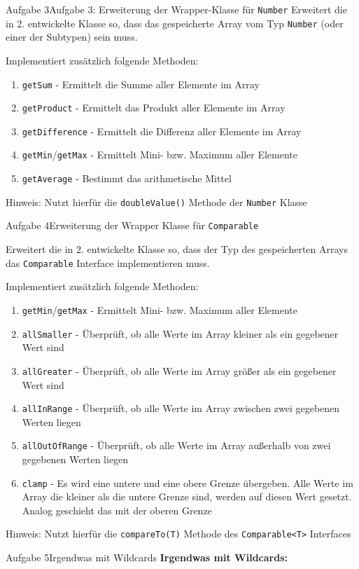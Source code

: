 \begin{frame}{Aufgabe 3}{Aufgabe 3: Erweiterung der Wrapper-Klasse für \texttt{Number}}    
    Erweitert die in 2. entwickelte Klasse so, dass das gespeicherte Array vom Typ \texttt{Number} (oder einer der Subtypen) sein muss.
    
    Implementiert zusätzlich folgende Methoden:
    \begin{enumerate}
        \item \texttt{getSum} - Ermittelt die Summe aller Elemente im Array
        \item \texttt{getProduct} - Ermittelt das Produkt aller Elemente im Array
        \item \texttt{getDifference} - Ermittelt die Differenz aller Elemente im Array
        \item \texttt{getMin}/\texttt{getMax} - Ermittelt Mini- bzw. Maximum aller Elemente
        \item \texttt{getAverage} - Bestimmt das arithmetische Mittel
    \end{enumerate}
    
    Hinweis: Nutzt hierfür die \texttt{doubleValue()} Methode der \texttt{Number} Klasse
\end{frame}
    
\begin{frame}[allowframebreaks]{Aufgabe 4}{Erweiterung der Wrapper Klasse für \texttt{Comparable}}
    
    Erweitert die in 2. entwickelte Klasse so, dass der Typ des gespeicherten Arrays das \texttt{Comparable} Interface implementieren muss.
    
    Implementiert zusätzlich folgende Methoden:
    \begin{enumerate}
        \item \texttt{getMin}/\texttt{getMax} - Ermittelt Mini- bzw. Maximum aller Elemente
        \item \texttt{allSmaller} - Überprüft, ob alle Werte im Array kleiner als ein gegebener Wert sind
        \item \texttt{allGreater} - Überprüft, ob alle Werte im Array größer als ein gegebener Wert sind
        \item \texttt{allInRange} - Überprüft, ob alle Werte im Array zwischen zwei gegebenen Werten liegen
        \item \texttt{allOutOfRange} - Überprüft, ob alle Werte im Array außerhalb von zwei gegebenen Werten liegen
        \item \texttt{clamp} - Es wird eine untere und eine obere Grenze übergeben. Alle Werte im Array die kleiner als die untere Grenze sind, werden auf diesen Wert gesetzt. Analog geschieht das mit der oberen Grenze
    \end{enumerate}
    
    Hinweis: Nutzt hierfür die \texttt{compareTo(T)} Methode des \texttt{Comparable<T>} Interfaces
\end{frame}

\begin{frame}{Aufgabe 5}{Irgendwas mit Wildcards}
    \textbf{Irgendwas mit Wildcards:}
\end{frame}